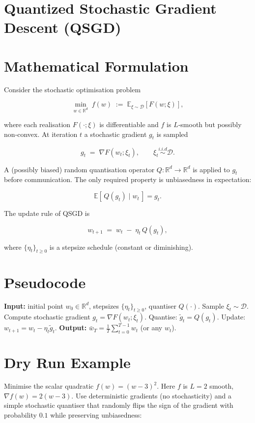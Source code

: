 \documentclass[11pt]{article}
\newcommand{\EE}{\mathbb{E}}
\newcommand{\RR}{\mathbb{R}}
\begin{document}
\section*{Quantized Stochastic Gradient Descent (QSGD)}

\section*{Mathematical Formulation}
Consider the stochastic optimisation problem  

\[
\min_{w\in\RR^{d}} \; f(w)\;:=\; \EE_{\xi\sim\mathcal{D}}[F(w;\xi)],
\]

where each realisation $F(\cdot;\xi)$ is differentiable and $f$ is $L$‑smooth but possibly non‑convex.  
At iteration $t$ a stochastic gradient $g_t$ is sampled

\[
g_t\;=\;\nabla F(w_t;\xi_t), \qquad \xi_t\stackrel{i.i.d}{\sim}\mathcal{D}.
\]

A (possibly biased) random quantisation operator $Q:\RR^{d}\rightarrow\RR^{d}$ is applied to $g_t$ before communication.  The only required property is unbiasedness in expectation:

\[
\EE[\,Q(g_t)\mid w_t\,]=g_t .
\tag{1}
\]

The update rule of QSGD is  

\[
w_{t+1}\;=\;w_t\;-\;\eta_t\, Q(g_t),
\tag{2}
\]

where $\{\eta_t\}_{t\ge 0}$ is a stepsize schedule (constant or diminishing).  

\section*{Pseudocode}
\begin{algorithm}[H]
\caption{Quantized Stochastic Gradient Descent (QSGD)}
\begin{algorithmic}[1]
\State \textbf{Input:} initial point $w_0\in\RR^{d}$, stepsizes $\{\eta_t\}_{t\ge0}$, quantiser $Q(\cdot)$.
    \State Sample $\xi_t\sim\mathcal{D}$.
    \State Compute stochastic gradient $g_t=\nabla F(w_t;\xi_t)$.
    \State Quantise: $\tilde g_t = Q(g_t)$.
    \State Update: $w_{t+1}= w_t-\eta_t \tilde g_t$.
\EndFor
\State \textbf{Output:} $\displaystyle \bar w_T=\frac{1}{T}\sum_{t=0}^{T-1} w_t$ (or any $w_t$).
\end{algorithmic}
\end{algorithm}

\section*{Dry Run Example}
Minimise the scalar quadratic $f(w)=(w-3)^2$.  
Here $f$ is $L=2$ smooth, $\nabla f(w)=2(w-3)$.  Use deterministic gradients (no stochasticity) and a simple stochastic quantiser that randomly flips the sign of the gradient with probability $0.1$ while preserving unbiasedness:
\end{document}
